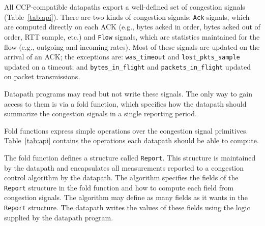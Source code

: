 All CCP-compatible datapaths export a well-defined set of congestion signals (Table~\ref{tab:api}). There are two kinds of congestion signals: \texttt{Ack} signals, which are computed directly on each ACK (e.g., bytes acked in order, bytes acked out of order, RTT sample, etc.) and \texttt{Flow} signals, which are statistics maintained for the flow (e.g., outgoing and incoming rates). Most of these signals are updated on the arrival of an ACK; the exceptions are: \texttt{was\_timeout} and \texttt{lost\_pkts\_sample} updated on a timeout; and \texttt{bytes\_in\_flight} and \texttt{packets\_in\_flight} updated on packet transmissions.
 

Datapath programs may read but not write these signals. The only way to gain access to them is via a fold function, which specifies how the datapath should summarize the congestion signals in a single reporting period. 
 
 
%

Fold functions express simple operations over the congestion signal primitives. Table~\ref{tab:api} contains the operations each datapath should be able to compute. 

 
The fold function defines a structure called \texttt{Report}. This structure is maintained by the datapath and encapsulates all measurements reported to a congestion control algorithm by the datapath. The algorithm specifies the fields of the \texttt{Report} structure in the fold function and how to compute each field from congestion signals. The algorithm may define as many fields as it wants in the \texttt{Report} structure. The datapath writes the values of these fields using the logic supplied by the datapath program.
 
